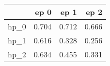 \begin{tabular}{lrrr}
\toprule
{} &   ep 0 &   ep 1 &   ep 2 \\
\midrule
hp\_0 &  0.704 &  0.712 &  0.666 \\
hp\_1 &  0.616 &  0.328 &  0.256 \\
hp\_2 &  0.634 &  0.455 &  0.331 \\
\bottomrule
\end{tabular}
